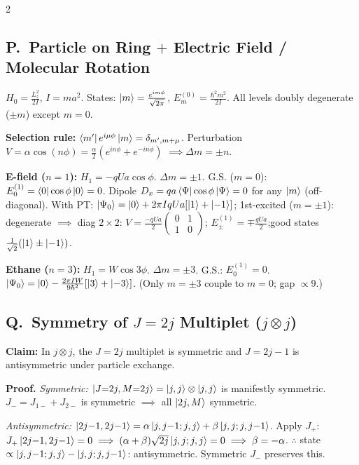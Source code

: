 \documentclass[9pt,a4paper]{article} %
\begin{document}
\begin{multicols}{2}
\subsection{P.\ Particle on Ring $+$ Electric Field / Molecular Rotation}
$H_0=\frac{L_z^2}{2I}$,\; $I=ma^2$.\; States: $\ket{m}=\frac{e^{im\phi}}{\sqrt{2\pi}}$,\; $E_m^{(0)}=\frac{\hbar^2 m^2}{2I}$.
All levels doubly degenerate ($\pm m$) except $m=0$.

\textbf{Selection rule:} $\bra{m'}e^{i\mu\phi}\ket{m}=\delta_{m',m+\mu}$.\;
Perturbation $V=\alpha\cos(n\phi)=\frac{\alpha}{2}(e^{in\phi}+e^{-in\phi})$ $\implies\Delta m=\pm n$.

\textbf{E-field ($n=1$):} $H_1=-qU a\cos\phi$.\; $\Delta m=\pm 1$.
G.S. ($m=0$): $E^{(1)}_0=\bra{0}\cos\phi\ket{0}=0$.
Dipole $D_x=qa\bra{\Psi}{\cos\phi}\ket{\Psi}=0$ for any $\ket{m}$ (off-diagonal).
With PT: $\ket{\Psi_0}=\ket{0}+2\pi IqUa[\ket{1}+\ket{-1}]$;
1st-excited ($m=\pm 1$): degenerate $\implies$ diag $2\times 2$:
$V=\frac{-qUa}{2}\begin{pmatrix}0&1\\1&0\end{pmatrix}$;\;
$E_\pm^{(1)}=\mp\frac{qUa}{2}$;\;good states $\frac{1}{\sqrt{2}}(\ket{1}\pm\ket{-1})$.

\textbf{Ethane ($n=3$):} $H_1=W\cos 3\phi$.\; $\Delta m=\pm 3$.
G.S.: $E^{(1)}_0=0$.\; $\ket{\Psi_0}=\ket{0}-\frac{2\pi IW}{9\hbar^2}[\ket{3}+\ket{-3}]$.
(Only $m=\pm 3$ couple to $m=0$; gap $\propto 9$.)

\subsection{Q.\ Symmetry of $J{=}2j$ Multiplet ($j\otimes j$)}
\textbf{Claim:} In $j\otimes j$, the $J=2j$ multiplet is symmetric and $J=2j-1$ is antisymmetric under particle exchange.

\textbf{Proof.}
\textit{Symmetric:} $\ket{J{=}2j,M{=}2j}=\ket{j,j}\otimes\ket{j,j}$ is manifestly symmetric.
$J_-=J_{1-}+J_{2-}$ is symmetric $\implies$ all $\ket{2j,M}$ symmetric.

\textit{Antisymmetric:} $\ket{2j{-}1,2j{-}1}=\alpha\ket{j,j{-}1;j,j}+\beta\ket{j,j;j,j{-}1}$.
Apply $J_+$: $J_+\ket{2j{-}1,2j{-}1}=0 \implies (\alpha+\beta)\sqrt{2j}\ket{j,j;j,j}=0 \implies \beta=-\alpha$.
$\therefore$ state $\propto\ket{j,j{-}1;j,j}-\ket{j,j;j,j{-}1}$: antisymmetric. Symmetric $J_-$ preserves this.


\end{multicols}
\end{document}
